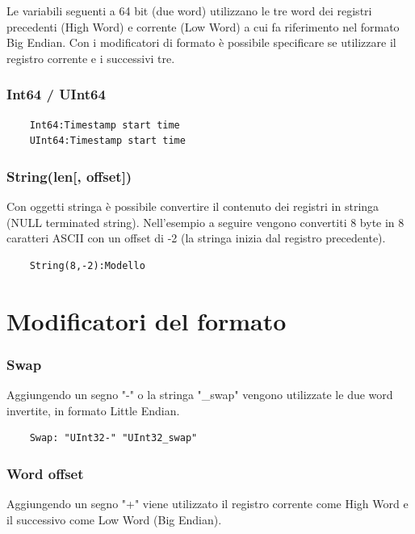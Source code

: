 Le variabili seguenti a 64 bit (due word) utilizzano le tre word dei registri precedenti (High Word) e
corrente (Low Word) a cui fa riferimento nel formato Big Endian. Con i modificatori 
di formato è possibile specificare se utilizzare il registro corrente e i successivi tre.

\subsubsection{Int64 / UInt64}

\begin{verbatim}
    Int64:Timestamp start time
    UInt64:Timestamp start time
\end{verbatim}

\subsubsection{String(len[, offset])}

Con oggetti stringa è possibile convertire il contenuto dei registri
in stringa (NULL terminated string). Nell'esempio a seguire
vengono convertiti 8 byte in 8 caratteri ASCII con un offset di -2
(la stringa inizia dal registro precedente).

\begin{verbatim}
    String(8,-2):Modello
\end{verbatim}

\section{Modificatori del formato}

\subsubsection{Swap}

Aggiungendo un segno "-" o la stringa "\_swap" vengono utilizzate 
le due word invertite, in formato Little Endian.

\begin{verbatim}
    Swap: "UInt32-" "UInt32_swap"
\end{verbatim}

\subsubsection{Word offset}

Aggiungendo un segno "+" viene utilizzato il registro corrente come High Word e il successivo
come Low Word (Big Endian).

